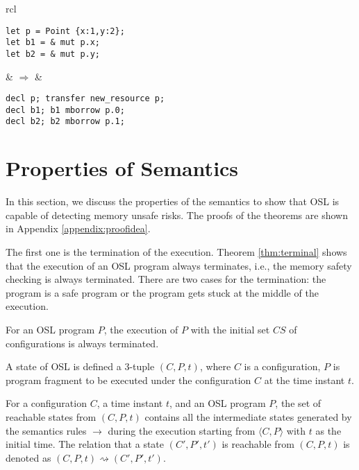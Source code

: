 \documentclass[runningheads]{llncs}
\newcommand{\cfg}[1]{\langle #1\rangle}
\begin{document}
\begin{tabular}{rcl}
\begin{minipage}{0.33\textwidth}
\renewcommand{\ttdefault}{pcr}
\begin{lstlisting}
let p = Point {x:1,y:2};
let b1 = & mut p.x;
let b2 = & mut p.y;
\end{lstlisting}
\end{minipage}
& \quad\quad $\Rightarrow$ \quad\quad\quad &
\begin{minipage}{0.4\textwidth}
	\renewcommand{\ttdefault}{pcr}
	\begin{lstlisting}
decl p; transfer new_resource p;
decl b1; b1 mborrow p.0;
decl b2; b2 mborrow p.1;
	\end{lstlisting}
\end{minipage}

\end{tabular}


\section{Properties of Semantics}
\label{sec:properties}

In this section, we discuss the properties of the semantics to show that OSL is capable of detecting memory unsafe risks.
The proofs of the theorems are shown in Appendix  \ref{appendix:proofidea}.

The first one is the termination of the execution. Theorem \ref{thm:terminal} shows that the execution of an OSL program always terminates, i.e., the memory safety checking is always terminated. There are two cases for the termination: the program is a safe program or the program gets stuck at the middle of the execution. 

\begin{theorem}[Termination]
	\label{thm:terminal}
	For an OSL program $P$, the execution of $P$ with the initial set $CS$ of configurations is always terminated.
\end{theorem}

\begin{definition}[States]
 A state of OSL is defined a  3-tuple $(C, P, t)$, where $C$ is a configuration, $P$ is program fragment to be executed under the configuration $C$ at the time instant $t$.
\end{definition}

\begin{definition}
	\label{def:reachablestates}
For a configuration $C$,  a time instant $t$, and an OSL program $P$, the set of reachable states from $(C,P,t)$ contains 
all the intermediate states generated by the semantics rules $\rightarrow$ during the execution starting from $\cfg{C,P}$ with $t$ as the initial time. 
The relation that a state $(C',P',t')$ is reachable from $(C,P,t)$ is denoted as $(C,P,t)\rightsquigarrow(C',P',t').$
\end{definition}
\end{document}
